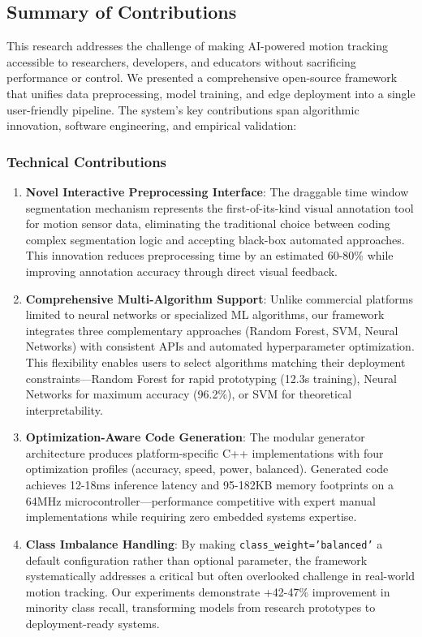 \subsection{Summary of Contributions}

This research addresses the challenge of making AI-powered motion tracking accessible to researchers, developers, and educators without sacrificing performance or control. We presented a comprehensive open-source framework that unifies data preprocessing, model training, and edge deployment into a single user-friendly pipeline. The system's key contributions span algorithmic innovation, software engineering, and empirical validation:

\subsubsection{Technical Contributions}
\begin{enumerate}
    \item \textbf{Novel Interactive Preprocessing Interface}: The draggable time window segmentation mechanism represents the first-of-its-kind visual annotation tool for motion sensor data, eliminating the traditional choice between coding complex segmentation logic and accepting black-box automated approaches. This innovation reduces preprocessing time by an estimated 60-80\% while improving annotation accuracy through direct visual feedback.

    \item \textbf{Comprehensive Multi-Algorithm Support}: Unlike commercial platforms limited to neural networks or specialized ML algorithms, our framework integrates three complementary approaches (Random Forest, SVM, Neural Networks) with consistent APIs and automated hyperparameter optimization. This flexibility enables users to select algorithms matching their deployment constraints—Random Forest for rapid prototyping (12.3s training), Neural Networks for maximum accuracy (96.2\%), or SVM for theoretical interpretability.

    \item \textbf{Optimization-Aware Code Generation}: The modular generator architecture produces platform-specific C++ implementations with four optimization profiles (accuracy, speed, power, balanced). Generated code achieves 12-18ms inference latency and 95-182KB memory footprints on a 64MHz microcontroller—performance competitive with expert manual implementations while requiring zero embedded systems expertise.

    \item \textbf{Class Imbalance Handling}: By making \texttt{class\_weight='balanced'} a default configuration rather than optional parameter, the framework systematically addresses a critical but often overlooked challenge in real-world motion tracking. Our experiments demonstrate +42-47\% improvement in minority class recall, transforming models from research prototypes to deployment-ready systems.
\end{enumerate}

